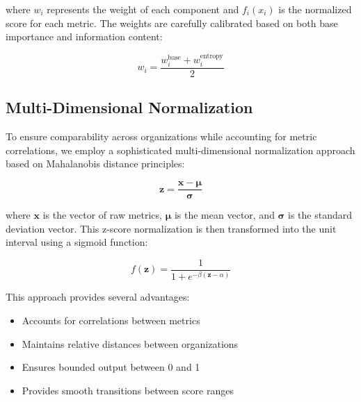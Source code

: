 \documentclass[12pt]{article}
\begin{document}
where $w_i$ represents the weight of each component and $f_i(x_i)$ is the normalized score for each metric. The weights are carefully calibrated based on both base importance and information content:

\begin{equation}
    w_i = \frac{w_i^{\text{base}} + w_i^{\text{entropy}}}{2}
\end{equation}

\subsection{Multi-Dimensional Normalization}

To ensure comparability across organizations while accounting for metric correlations, we employ a sophisticated multi-dimensional normalization approach based on Mahalanobis distance principles:

\begin{equation}
    \mathbf{z} = \frac{\mathbf{x} - \mathbf{\mu}}{\mathbf{\sigma}}
\end{equation}

where $\mathbf{x}$ is the vector of raw metrics, $\mathbf{\mu}$ is the mean vector, and $\mathbf{\sigma}$ is the standard deviation vector. This z-score normalization is then transformed into the unit interval using a sigmoid function:

\begin{equation}
    f(\mathbf{z}) = \frac{1}{1 + e^{-\beta(\mathbf{z} - \alpha)}}
\end{equation}

This approach provides several advantages:
\begin{itemize}
    \item Accounts for correlations between metrics
    \item Maintains relative distances between organizations
    \item Ensures bounded output between 0 and 1
    \item Provides smooth transitions between score ranges
\end{itemize}
\end{document}
